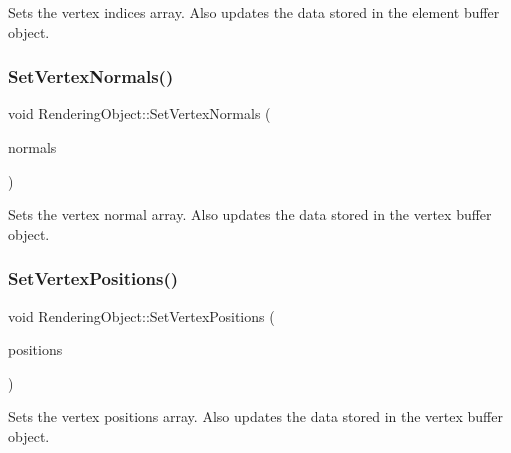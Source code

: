 Sets the vertex indices array. Also updates the data stored in the element buffer object.

\hypertarget{class_rendering_object_a4cd085aed01fbc5e4fae7076e00919d3}{}\label{class_rendering_object_a4cd085aed01fbc5e4fae7076e00919d3}
\subsubsection{\texorpdfstring{Set\+Vertex\+Normals()}{SetVertexNormals()}}
{\footnotesize\ttfamily void Rendering\+Object\+::\+Set\+Vertex\+Normals (\begin{DoxyParamCaption}\item[{std\+::unique\+\_\+ptr$<$ \hyperlink{class_rendering_object_a327c4d892de8d6138fb59afa6d078257}{Normal\+Array} $>$}]{normals }\end{DoxyParamCaption})\hspace{0.3cm}{\ttfamily [virtual]}}



Sets the vertex normal array. Also updates the data stored in the vertex buffer object.

\hypertarget{class_rendering_object_ada51886b7da1924a17d3a55e8fe90061}{}\label{class_rendering_object_ada51886b7da1924a17d3a55e8fe90061}
\subsubsection{\texorpdfstring{Set\+Vertex\+Positions()}{SetVertexPositions()}}
{\footnotesize\ttfamily void Rendering\+Object\+::\+Set\+Vertex\+Positions (\begin{DoxyParamCaption}\item[{std\+::unique\+\_\+ptr$<$ \hyperlink{class_rendering_object_a1223b9cf03f2029b9c43d71042c2a18e}{Position\+Array} $>$}]{positions }\end{DoxyParamCaption})\hspace{0.3cm}{\ttfamily [virtual]}}



Sets the vertex positions array. Also updates the data stored in the vertex buffer object.

\hypertarget{class_rendering_object_a041c99c6f0d570bb7c36b9d2168f0b0d}{}\label{class_rendering_object_a041c99c6f0d570bb7c36b9d2168f0b0d}
